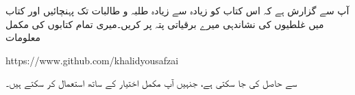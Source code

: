 آپ سے گزارش ہے کہ اس کتاب کو زیادہ سے زیادہ طلبہ و طالبات تک پہنچائیں اور کتاب میں غلطیوں کی نشاندہی میرے   برقیاتی  پتہ پر کریں۔میری تمام کتابوں کی مکمل  معلومات

{
\begin{otherlanguage}{english}
https:/\!\!/www.github.com/khalidyousafzai
\end{otherlanguage}
}

سے حاصل کی جا سکتی ہے،  جنہیں آپ مکمل اختیار کے ساتھ استعمال کر سکتے ہیں۔
\vspace{5mm}

{}


